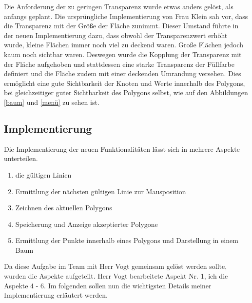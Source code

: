 Die Anforderung der zu geringen Transparenz wurde etwas anders gelöst, als anfangs geplant. Die ursprüngliche Implementierung von Frau Klein sah vor, dass die Transparenz mit der Größe der Fläche zunimmt. Dieser Umstand führte in der neuen Implementierung dazu, dass obwohl der Transparenzwert erhöht wurde, kleine Flächen immer noch viel zu deckend waren. Große Flächen jedoch kaum noch sichtbar waren. Deswegen wurde die Kopplung der Transparenz mit der Fläche aufgehoben und stattdessen eine starke Transparenz der Füllfarbe definiert und die Fläche zudem mit einer deckenden Umrandung versehen. Dies ermöglicht eine gute Sichtbarkeit der Knoten und Werte innerhalb des Polygons, bei gleichzeitiger guter Sichtbarkeit des Polygons selbst, wie auf den Abbildungen \ref{baum} und \ref{menü} zu sehen ist.



\subsection{Implementierung}

Die Implementierung der neuen Funktionalitäten lässt sich in mehrere Aspekte unterteilen.
\begin{enumerate}
\item die gültigen Linien
\item Ermittlung der nächsten gültigen Linie zur Mausposition
\item Zeichnen des aktuellen Polygons
\item Speicherung und Anzeige akzeptierter Polygone
\item Ermittlung der Punkte innerhalb eines Polygons und Darstellung in einem Baum
\end{enumerate}

Da diese Aufgabe im Team mit Herr Vogt gemeinsam gelöst werden sollte, wurden die Aspekte aufgeteilt. Herr Vogt bearbeitete Aspekt Nr. 1, ich die Aspekte 4 - 6. Im folgenden sollen nun die wichtigsten Details meiner Implementierung erläutert werden.

